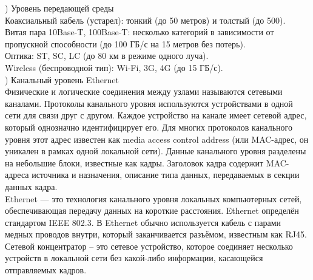 ) Уровень передающей среды \\
Коаксиальный кабель (устарел): тонкий (до 50 метров) и толстый (до 500). \\
Витая пара 10Base-T, 100Base-T: несколько категорий в зависимости от пропускной способности (до 100 ГБ/с на 15 метров без потерь). \\
Оптика: ST, SC, LC (до 80 км в режиме одного луча). \\
Wireless (беспроводной тип): Wi-Fi, 3G, 4G (до 15 ГБ/с). \\

) Канальный уровень Ethernet \\
Физические и логические соединения между узлами называются сетевыми каналами. Протоколы канального уровня используются устройствами в одной сети для связи друг с другом. Каждое устройство на канале имеет сетевой адрес, который однозначно идентифицирует его. Для многих протоколов канального уровня этот адрес известен как media access control address (или MAC-адрес, он уникален в рамках одной локальной сети). Данные канального уровня разделены на небольшие блоки, известные как кадры. Заголовок кадра содержит MAC-адреса источника и назначения, описание типа данных, передаваемых в секции данных кадра. \\
Ethernet — это технология канального уровня локальных компьютерных сетей, обеспечивающая передачу данных на короткие расстояния. Ethernet определён стандартом IEEE 802.3. В Ethernet обычно используется кабель с парами медных проводов внутри, который заканчивается разъёмом, известным как RJ45. \\
Сетевой концентратор – это сетевое устройство, которое соединяет несколько устройств в локальной сети без какой-либо информации, касающейся отправляемых кадров. \\

